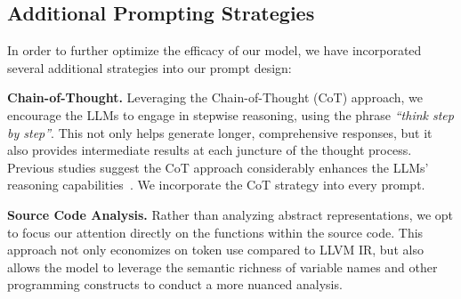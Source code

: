 \subsection{Additional Prompting Strategies}
\label{subsec:other_prompt}

In order to further optimize the efficacy of our model, we have incorporated several additional strategies into our prompt design:

\squishlist

\item \textbf{Chain-of-Thought.}
Leveraging the Chain-of-Thought (CoT) approach, we encourage the LLMs to engage in stepwise reasoning, using the phrase \textit{``think step by step''}. This not only helps generate longer, comprehensive responses, but it also provides intermediate results at each juncture of the thought process. Previous studies suggest the CoT approach considerably enhances the LLMs' reasoning capabilities~\cite{chen_when_2023}. We incorporate the CoT strategy into every prompt.

\item \textbf{Source Code Analysis.}
Rather than analyzing abstract representations, we opt to focus our attention directly on the functions within the source code. This approach not only economizes on token use compared to LLVM IR, but also allows the model to leverage the semantic richness of variable names and other programming constructs to conduct a more nuanced analysis.


\squishend











